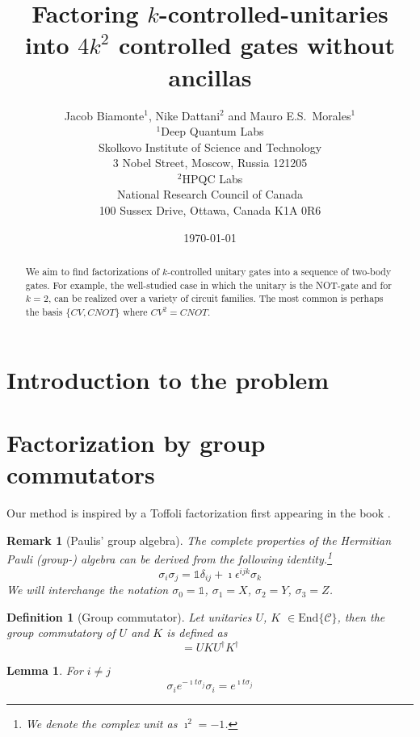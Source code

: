 \documentclass[12pt]{article}
\title{Factoring $k$-controlled-unitaries into $4k^2$ controlled gates without ancillas}
\date{\today}
\author{Jacob Biamonte$^1$, Nike Dattani$^2$ and Mauro E.S.~Morales$^1$\\$^1$Deep Quantum Labs\\ Skolkovo Institute of Science and Technology\\ 3 Nobel Street, 
Moscow, Russia 121205\\
$^2$HPQC Labs \\ National Research Council of Canada \\ 100 Sussex Drive, Ottawa, Canada K1A 0R6}
\newcommand{\1}[1]{\mathds{1}\left[#1\right]}
\newtheorem{remark}{Remark}
\newtheorem{definition}{Definition}
\newtheorem{lemma}{Lemma}
\newcommand{\eye}{\mathds{1}} %
\begin{document}
\maketitle

\begin{abstract}
We aim to find factorizations of $k$-controlled unitary gates into a sequence of two-body gates.  For example,
the well-studied case in which the unitary is the NOT-gate and for $k = 2$, can be realized over a variety of circuit families.  The most common is perhaps the basis $\{CV, CNOT\}$ where $CV^2 = CNOT$. 
\end{abstract}

\section{Introduction to the problem}\label{sec:intro}

\section{Factorization by group commutators}\label{sec:method}

Our method is inspired by a Toffoli factorization first appearing in the book \cite{Kitaev}. 

\begin{remark}[Paulis' group algebra]
The complete properties of the Hermitian Pauli (group-) algebra can be derived from the following identity.\footnote{We denote the complex unit as $\imath^2 = -1$.}
\begin{equation}
    \sigma_i \sigma_j = \eye \delta_{ij} + \imath \epsilon^{ijk}\sigma_k
\end{equation}
We will interchange the notation $\sigma_0 = \eye$, $\sigma_1 = X$, $\sigma_2 = Y$, $\sigma_3 = Z$. 
\end{remark}

\begin{definition}[Group commutator]\label{def:taction}
Let unitaries $U$, $K$ $\in \text{End}\{\mathcal C\}$, then the group commutatory of $U$ and $K$  is defined as 
\begin{equation}
    [U, K] = U K U^\dagger K^\dagger 
\end{equation}
\end{definition} 

\begin{lemma}\label{lem:dag}
For $i\neq j$ 
\begin{equation}
    \sigma_i e^{-\imath t \sigma_j}\sigma_i = e^{\imath t \sigma_j}
\end{equation}
\end{lemma}
\end{document}
